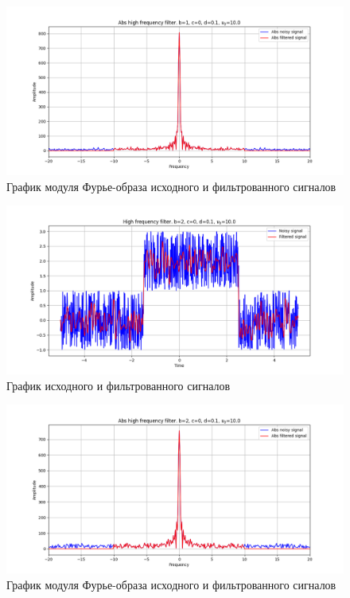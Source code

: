 \documentclass[a4paper, 12pt]{article}
\begin{document}
    \begin{figure}[!htb]
        \centering
        \includegraphics[scale=0.485]{2_abs_u_U_nohigh.png}
        \captionsetup{skip=0pt}
        \caption{График модуля Фурье-образа исходного и фильтрованного сигналов}
        \label{fig:fig4}
    \end{figure}
    \begin{figure}[!htb]
        \centering
        \includegraphics[scale=0.485]{3_u_flt_u_nohigh.png}
        \captionsetup{skip=0pt}
        \caption{График исходного и фильтрованного сигналов}
        \label{fig:fig5}
    \end{figure}
    \begin{figure}[!htb]
        \centering
        \includegraphics[scale=0.485]{3_abs_u_U_nohigh.png}
        \captionsetup{skip=0pt}
        \caption{График модуля Фурье-образа исходного и фильтрованного сигналов}
        \label{fig:fig6}
    \end{figure}
\end{document}
